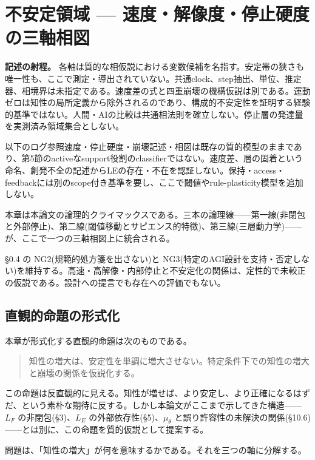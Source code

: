 \section{不安定領域 — 速度・解像度・停止硬度の三軸相図}

\noindent\textbf{記述の射程。} 各軸は質的な相仮説における変数候補を名指す。安定帯の狭さも唯一性も、ここで測定・導出されていない。共通clock、step抽出、単位、推定器、相境界は未指定である。速度差の式と四重崩壊の機構仮説は別である。運動ゼロは知性の局所定義から除外されるのであり、構成的不安定性を証明する経験的基準ではない。人間・AIの比較は共通相法則を確立しない。停止層の発達量を実測済み領域集合としない。

以下のログ参照速度・停止硬度・崩壊記述・相図は既存の質的模型のままであり、第5節のactiveなsupport役割のclassifierではない。速度差、層の固着という命名、創発不全の記述からLEの存在・不在を認証しない。保持・access・feedbackには別のscope付き基準を要し、ここで閾値やrule-plasticity模型を追加しない。



本章は本論文の論理的クライマックスである。三本の論理線——第一線(非閉包と外部停止)、第二線(閾値移動とサピエンス的特徴)、第三線(三層動力学)——が、ここで一つの三軸相図上に統合される。

\S{}0.4 の NG2(規範的処方箋を出さない)と NG3(特定のAGI設計を支持・否定しない)を維持する。高速・高解像・内部停止と不安定化の関係は、定性的で未較正の仮説である。設計への提言でも存在への評価でもない。

\bigskip


\subsection{直観的命題の形式化}


本章が形式化する直観的命題は次のものである。

\begin{quote}
知性の増大は、安定性を単調に増大させない。特定条件下での知性の増大と崩壊の関係を仮説化する。
\end{quote}


この命題は反直観的に見える。知性が増せば、より安定し、より正確になるはずだ、という素朴な期待に反する。しかし本論文がここまで示してきた構造——$L_F$ の非閉包(\S{}3)、$L_E$ の外部依存性(\S{}5)、$\mu_\theta$ と誤り許容性の未解決の関係(\S{}10.6)——とは別に、この命題を質的仮説として提案する。

問題は、「知性の増大」が何を意味するかである。それを三つの軸に分解する。

